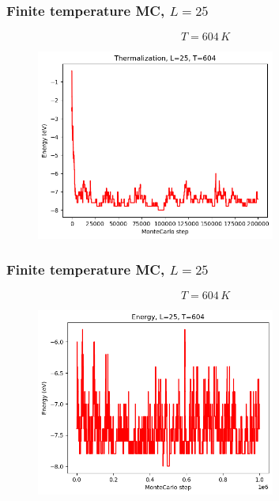 \documentclass{beamer}
\begin{document}
\begin{frame}
    \frametitle{Finite temperature MC, $L=25$}

    $$T=604\,K$$

    \begin{figure}
        \includegraphics[width=0.7\textwidth]{images/cterm25T604.png}
    \end{figure}

\end{frame}

\begin{frame}
    \frametitle{Finite temperature MC, $L=25$}

    $$T=604\,K$$

    \begin{figure}
        \includegraphics[width=0.7\textwidth]{images/cenergy25T604.png}
    \end{figure}

\end{frame}
\end{document}
